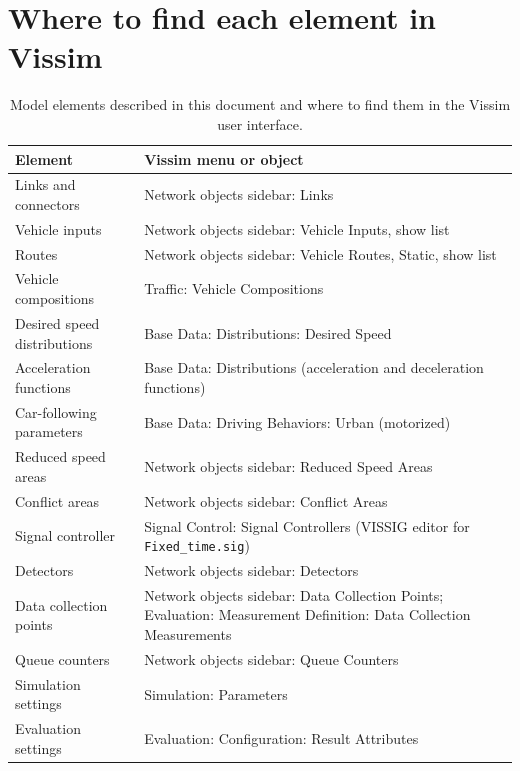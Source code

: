 \documentclass[11pt,a4paper]{article}
\newcommand{\code}[1]{\texttt{#1}}
\begin{document}
\appendix
\section{Where to find each element in Vissim}
\label{app:where}

\begin{table}[!htb]
\centering
\caption[Model elements and where to find them in Vissim]{Model elements described in this
document and where to find them in the Vissim user interface.}
\label{tab:where}
\small
\begin{tabularx}{\textwidth}{lX}
\toprule
\textbf{Element} & \textbf{Vissim menu or object}\\
\midrule
Links and connectors & Network objects sidebar: Links\\
Vehicle inputs & Network objects sidebar: Vehicle Inputs, show list\\
Routes & Network objects sidebar: Vehicle Routes, Static, show list\\
Vehicle compositions & Traffic: Vehicle Compositions\\
Desired speed distributions & Base Data: Distributions: Desired Speed\\
Acceleration functions & Base Data: Distributions (acceleration and deceleration functions)\\
Car-following parameters & Base Data: Driving Behaviors: Urban (motorized)\\
Reduced speed areas & Network objects sidebar: Reduced Speed Areas\\
Conflict areas & Network objects sidebar: Conflict Areas\\
Signal controller & Signal Control: Signal Controllers (VISSIG editor for \code{Fixed\_time.sig})\\
Detectors & Network objects sidebar: Detectors\\
Data collection points & Network objects sidebar: Data Collection Points; Evaluation: Measurement
Definition: Data Collection Measurements\\
Queue counters & Network objects sidebar: Queue Counters\\
Simulation settings & Simulation: Parameters\\
Evaluation settings & Evaluation: Configuration: Result Attributes\\
\bottomrule
\end{tabularx}
\end{table}
\end{document}
